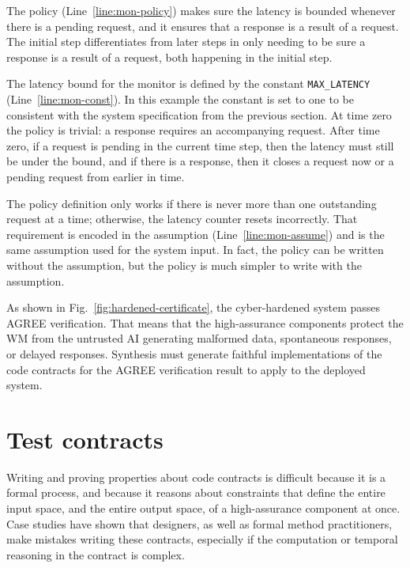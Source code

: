 \documentclass[global,twocolumn]{svjour}
\newcommand{\figref}[1]{Fig.~\ref{#1}}
\newcommand{\lineref}[1]{Line~\ref{#1}}
\begin{document}
The policy (\lineref{line:mon-policy}) makes sure the latency is bounded whenever there is a pending request, and it ensures that a response is a result of a request.
%
The initial step differentiates from later steps in only needing to be sure a response is a result of a request, both happening in the initial step.

The latency bound for the monitor is defined by the constant \texttt{MAX\_LATENCY} (\lineref{line:mon-const}).
%
In this example the constant is set to one to be consistent with the system specification from the previous section.
%
At time zero the policy is trivial: a response requires an accompanying request.
%
After time zero, if a request is pending in the current time step, then the latency must still be under the bound, and if there is a response, then it closes a request now or a pending request from earlier in time.

The policy definition only works if there is never more than one outstanding request at a time;
%
otherwise, the latency counter resets incorrectly.
%
That requirement is encoded in the assumption (\lineref{line:mon-assume}) and is the same assumption used for the system input.
%
In fact, the policy can be written without the assumption, but the policy is much simpler to write with the assumption.

As shown in \figref{fig:hardened-certificate}, the cyber-hardened system passes AGREE verification.
%
That means that the high-assurance components protect the WM from the untrusted AI generating malformed data, spontaneous responses, or delayed responses.
%
Synthesis must generate faithful implementations of the code contracts for the AGREE verification result to apply to the deployed system.


\section{Test contracts}
\label{sec:testing}

Writing and proving properties about code contracts is difficult because it is a formal process, and because it reasons about constraints that define the entire input space, and the entire output space, of a high-assurance component at once.
%
Case studies have shown that designers, as well as formal method practitioners, make mistakes writing these contracts, especially if the computation or temporal reasoning in the contract is complex.
\end{document}
